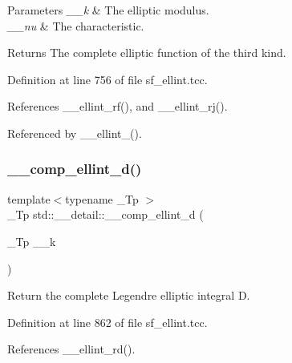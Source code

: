 \begin{DoxyParams}{Parameters}
{\em \+\_\+\+\_\+k} & The elliptic modulus. \\
\hline
{\em \+\_\+\+\_\+nu} & The characteristic. \\
\hline
\end{DoxyParams}
\begin{DoxyReturn}{Returns}
The complete elliptic function of the third kind. 
\end{DoxyReturn}


Definition at line 756 of file sf\+\_\+ellint.\+tcc.



References \+\_\+\+\_\+ellint\+\_\+rf(), and \+\_\+\+\_\+ellint\+\_\+rj().



Referenced by \+\_\+\+\_\+ellint\+\_().

\mbox{\label{namespacestd_1_1____detail_add5220a1ab03915e4a45dc547bb8eef6}} 
\subsubsection{\texorpdfstring{\+\_\+\+\_\+comp\+\_\+ellint\+\_\+d()}{\_\_comp\_ellint\_d()}}
{\footnotesize\ttfamily template$<$typename \+\_\+\+Tp $>$ \\
\+\_\+\+Tp std\+::\+\_\+\+\_\+detail\+::\+\_\+\+\_\+comp\+\_\+ellint\+\_\+d (\begin{DoxyParamCaption}\item[{\+\_\+\+Tp}]{\+\_\+\+\_\+k }\end{DoxyParamCaption})}

Return the complete Legendre elliptic integral D. 

Definition at line 862 of file sf\+\_\+ellint.\+tcc.



References \+\_\+\+\_\+ellint\+\_\+rd().

\mbox{\label{namespacestd_1_1____detail_a41ecec8820344d3575b464ecd4db5171}} 
